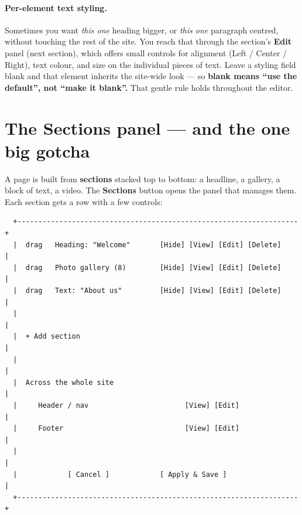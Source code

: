 \documentclass[11pt]{article}
\begin{document}
\paragraph{Per-element text styling.} Sometimes you want \emph{this one} heading
bigger, or \emph{this one} paragraph centred, without touching the rest of the site.
You reach that through the section's \textbf{Edit} panel (next section), which offers
small controls for alignment (Left / Center / Right), text colour, and size on the
individual pieces of text. Leave a styling field blank and that element inherits the
site-wide look --- so \textbf{blank means ``use the default'', not ``make it blank''.}
That gentle rule holds throughout the editor.

\section{The Sections panel --- and the one big gotcha}\label{sec:sections}

A page is built from \textbf{sections} stacked top to bottom: a headline, a gallery,
a block of text, a video. The \textbf{Sections} button opens the panel that manages
them. Each section gets a row with a few controls:

\begin{lstlisting}
  +-------------------------------------------------------------------+
  |  drag   Heading: "Welcome"       [Hide] [View] [Edit] [Delete]    |
  |  drag   Photo gallery (8)        [Hide] [View] [Edit] [Delete]    |
  |  drag   Text: "About us"         [Hide] [View] [Edit] [Delete]    |
  |                                                                   |
  |  + Add section                                                    |
  |                                                                   |
  |  Across the whole site                                            |
  |     Header / nav                       [View] [Edit]              |
  |     Footer                             [View] [Edit]              |
  |                                                                   |
  |            [ Cancel ]            [ Apply & Save ]                 |
  +-------------------------------------------------------------------+
\end{lstlisting}
\end{document}
